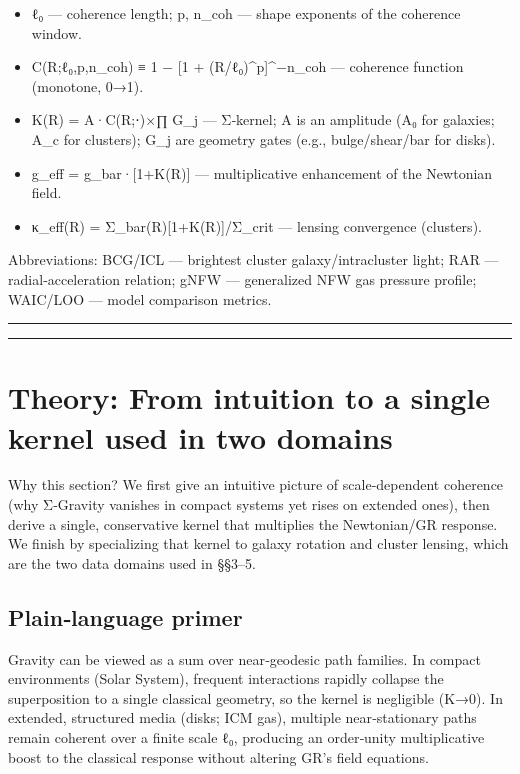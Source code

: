 \documentclass[11pt,a4paper]{article}
\begin{document}
\begin{itemize}
\item ℓ₀ — coherence length; p, n\_coh — shape exponents of the coherence window.
\item C(R;ℓ₀,p,n\_coh) ≡ 1 − [1 + (R/ℓ₀)^p]^{−n\_coh} — coherence function (monotone, 0→1).
\item K(R) = A·C(R;⋅)×∏ G\_j — Σ‑kernel; A is an amplitude (A₀ for galaxies; A\_c for clusters); G\_j are geometry gates (e.g., bulge/shear/bar for disks).
\item g\_eff = g\_bar·[1+K(R)] — multiplicative enhancement of the Newtonian field.
\item κ\_eff(R) = Σ\_bar(R)[1+K(R)]/Σ\_crit — lensing convergence (clusters).
\end{itemize}


Abbreviations: BCG/ICL — brightest cluster galaxy/intracluster light; RAR — radial‑acceleration relation; gNFW — generalized NFW gas pressure profile; WAIC/LOO — model comparison metrics.


\medskip\hrule\medskip

\medskip\hrule\medskip


\section{Theory: From intuition to a single kernel used in two domains}


Why this section? We first give an intuitive picture of scale‑dependent coherence (why Σ‑Gravity vanishes in compact systems yet rises on extended ones), then derive a single, conservative kernel that multiplies the Newtonian/GR response. We finish by specializing that kernel to galaxy rotation and cluster lensing, which are the two data domains used in §§3–5.


\subsection{Plain‑language primer}


Gravity can be viewed as a sum over near‑geodesic path families. In compact environments (Solar System), frequent interactions rapidly collapse the superposition to a single classical geometry, so the kernel is negligible (K→0). In extended, structured media (disks; ICM gas), multiple near‑stationary paths remain coherent over a finite scale ℓ₀, producing an order‑unity multiplicative boost to the classical response without altering GR’s field equations.
\end{document}

